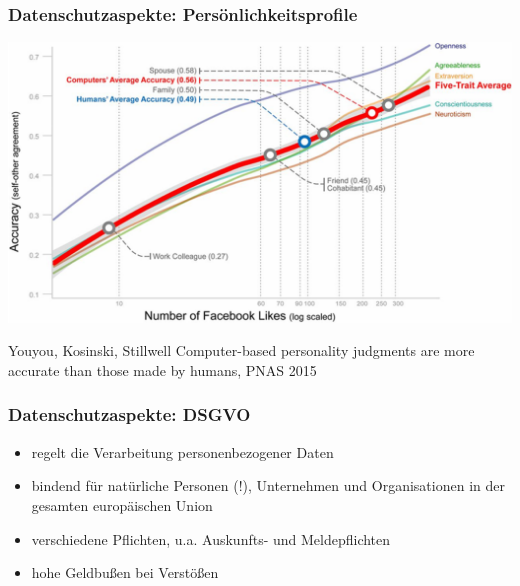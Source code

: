 
\begin{frame}
  \frametitle{Datenschutzaspekte: Persönlichkeitsprofile}


\includegraphics[scale=.5]{fig1/ocean-diagramm.png}

\footnotesize{Youyou, Kosinski, Stillwell Computer-based personality judgments are more accurate than those made by humans, PNAS 2015
}
\end{frame}


\begin{frame}
\frametitle{Datenschutzaspekte: DSGVO}

\begin{itemize}
\item regelt die Verarbeitung personenbezogener Daten
\item bindend für natürliche Personen (!), Unternehmen und Organisationen in der gesamten europäischen Union
\item verschiedene Pflichten, u.a. Auskunfts- und Meldepflichten
\item hohe Geldbußen bei Verstößen
\end{itemize}
    
\end{frame}


